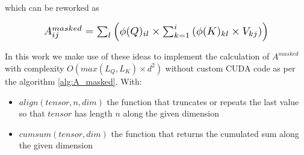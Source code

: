 \noindent{}which can be reworked as

\begin{equation}
	\resizebox{0.8\hsize}{!}{
		$A^{masked}_{ij}= \sum_l \left( \phi(Q)_{il} \times \sum_{k=1}^i \left(\phi(K)_{kl} \times V_{kj} \right) \right)$
	}
\end{equation}

In this work we make use of these ideas to implement the calculation of
 $A^{masked}$ with complexity $O(max(L_Q, L_K) \times d^2)$ without
 custom CUDA code as per the algorithm \ref{alg:A_masked}. With:
 \begin{itemize}
 	\item $align(tensor, n, dim)$ the function that truncates or repeats the last value so that $tensor$ has length $n$ along the given dimension
 	\item $cumsum(tensor, dim)$ the function that returns the cumulated sum along the given dimension
 \end{itemize}
